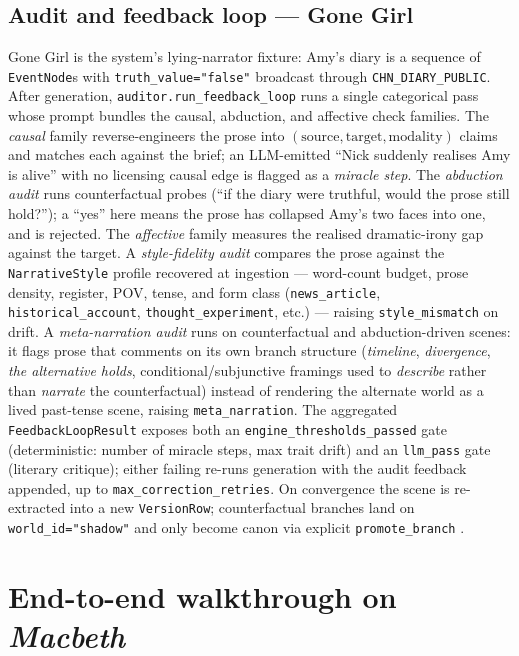 \documentclass[11pt]{article}
\begin{document}
\subsection{Audit and feedback loop --- Gone Girl}
\label{app:ex-audit}

Gone Girl is the system's lying-narrator fixture: Amy's diary is a
sequence of \texttt{EventNode}s with \texttt{truth\_value="false"}
broadcast through \texttt{CHN\_DIARY\_PUBLIC}. After generation,
\texttt{auditor.run\_feedback\_loop} runs a single categorical
pass whose prompt bundles the causal, abduction, and affective
check families. The \emph{causal} family reverse-engineers the prose into
$(\text{source}, \text{target}, \text{modality})$ claims and
matches each against the brief; an LLM-emitted ``Nick suddenly
realises Amy is alive'' with no licensing causal edge is flagged
as a \emph{miracle step}. The \emph{abduction audit} runs
counterfactual probes (``if the diary were truthful, would the
prose still hold?''); a ``yes'' here means the prose has
collapsed Amy's two faces into one, and is rejected. The
\emph{affective} family measures the realised dramatic-irony gap
against the target. A \emph{style-fidelity audit} compares the
prose against the \texttt{NarrativeStyle} profile recovered at
ingestion --- word-count budget, prose density, register, POV,
tense, and form class (\texttt{news\_article},
\texttt{historical\_account}, \texttt{thought\_experiment}, etc.)
--- raising \texttt{style\_mismatch} on drift. A
\emph{meta-narration audit} runs on counterfactual and
abduction-driven scenes: it flags prose that comments on its own
branch structure (\textit{timeline}, \textit{divergence},
\textit{the alternative holds}, conditional/subjunctive
framings used to \emph{describe} rather than \emph{narrate} the
counterfactual) instead of rendering the alternate world as a
lived past-tense scene, raising \texttt{meta\_narration}. The aggregated \texttt{FeedbackLoopResult}
exposes both an \texttt{engine\_thresholds\_passed} gate
(deterministic: number of miracle steps, max trait drift) and an
\texttt{llm\_pass} gate (literary critique); either failing
re-runs generation with the audit feedback appended, up to
\texttt{max\_correction\_retries}. On convergence the scene is
re-extracted into a new \texttt{VersionRow}; counterfactual
branches land on \texttt{world\_id="shadow"} and only become canon
via explicit \texttt{promote\_branch} \citep{correa2025amwn}.

\section{End-to-end walkthrough on \emph{Macbeth}}
\label{app:walkthrough}
\end{document}
